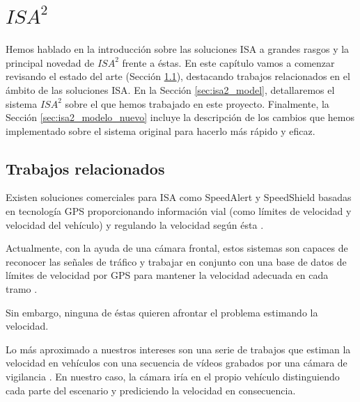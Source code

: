 \chapter{$ISA^{2}$}
\label{ch:isa2}

Hemos hablado en la introducción sobre las soluciones \ac{ISA} a grandes rasgos y la principal novedad de $ISA^{2}$ frente a éstas. En este capítulo vamos a comenzar revisando el estado del arte (Sección \ref{sec:isa2_estado_del_arte}), destacando trabajos relacionados en el ámbito de las soluciones \ac{ISA}. En la Sección \ref{sec:isa2_model}, detallaremos el sistema $ISA^{2}$ sobre el que hemos trabajado en este proyecto. Finalmente, la Sección \ref{sec:isa2_modelo_nuevo} incluye la descripción de los cambios que hemos implementado sobre el sistema original para hacerlo más rápido y eficaz.


\section{Trabajos relacionados}
\label{sec:isa2_estado_del_arte}

Existen soluciones comerciales para \ac{ISA} como SpeedAlert \cite{soluciones_comerciales} y SpeedShield basadas en tecnología GPS proporcionando información vial (como límites de velocidad y velocidad del vehículo) y regulando la velocidad según ésta \cite{speedshield}.

Actualmente, con la ayuda de una cámara frontal, estos sistemas son capaces de reconocer las señales de tráfico y trabajar en conjunto con una base de datos de límites de velocidad por GPS para mantener la velocidad adecuada en cada tramo \cite{sol_img}.

Sin embargo, ninguna de éstas quieren afrontar el problema estimando la velocidad.

Lo más aproximado a nuestros intereses son una serie de trabajos que estiman la velocidad en vehículos con una secuencia de vídeos grabados por una cámara de vigilancia \cite{isa2} \cite{shukla}. En nuestro caso, la cámara iría en el propio vehículo distinguiendo cada parte del escenario y prediciendo la velocidad en consecuencia.


